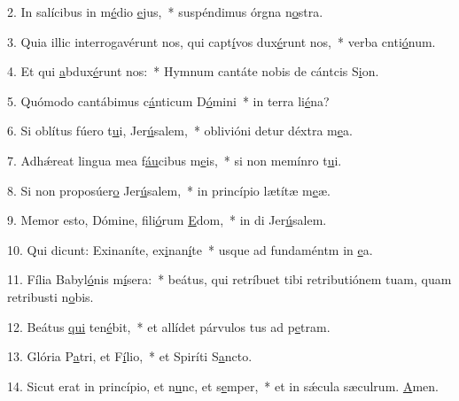 2. In salícibus in m\uline{é}dio \uline{e}jus,~* suspéndimus órgna n\uline{o}stra.\par 
3. Quia illic interrogavérunt nos, qui capt\uline{í}vos dux\uline{é}runt nos,~* verba cnti\uline{ó}num.\par 
4. Et qui \uline{a}bdux\uline{é}runt nos:~* Hymnum cantáte nobis de cántcis S\uline{i}on.\par 
5. Quómodo cantábimus c\uline{á}nticum D\uline{ó}mini~* in terra li\uline{é}na?\par 
6. Si oblítus fúero t\uline{u}i, Jer\uline{ú}salem,~* oblivióni detur déxtra m\uline{e}a.\par 
7. Adhǽreat lingua mea f\uline{áu}cibus m\uline{e}is,~* si non memínro t\uline{u}i.\par 
8. Si non proposúer\uline{o} Jer\uline{ú}salem,~* in princípio lætítæ m\uline{e}æ.\par 
9. Memor esto, Dómine, fili\uline{ó}rum \uline{E}dom,~* in di Jer\uline{ú}salem.\par 
10. Qui dicunt: Exinaníte, ex\uline{i}nan\uline{í}te~* usque ad fundaméntm in \uline{e}a.\par 
11. Fília Babyl\uline{ó}nis m\uline{í}sera:~* beátus, qui retríbuet tibi retributiónem tuam, quam retribusti n\uline{o}bis.\par 
12. Beátus \uline{qui} ten\uline{é}bit,~* et allídet párvulos tus ad p\uline{e}tram.\par 
13. Glória P\uline{a}tri, et F\uline{í}lio,~* et Spiríti S\uline{a}ncto.\par 
14. Sicut erat in princípio, et n\uline{u}nc, et s\uline{e}mper,~* et in sǽcula sæculrum. \uline{A}men.\par 
